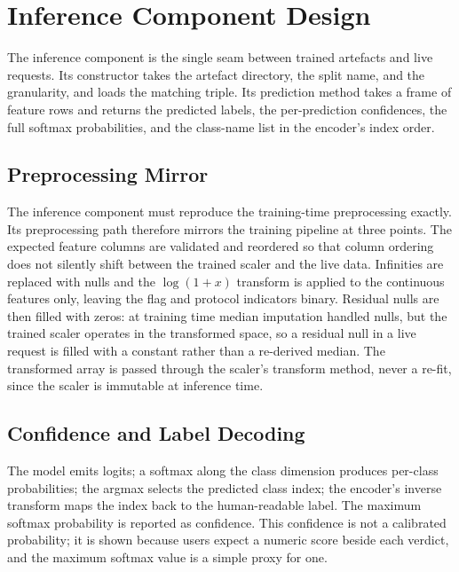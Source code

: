 \section{Inference Component Design}
\label{sec:inference_layer}

\par The inference component is the single seam between trained artefacts and live requests. Its constructor takes the artefact directory, the split name, and the granularity, and loads the matching triple. Its prediction method takes a frame of feature rows and returns the predicted labels, the per-prediction confidences, the full softmax probabilities, and the class-name list in the encoder's index order.

\subsection{Preprocessing Mirror}
\label{subsec:preprocessing_mirror}

\par The inference component must reproduce the training-time preprocessing exactly. Its preprocessing path therefore mirrors the training pipeline at three points. The expected feature columns are validated and reordered so that column ordering does not silently shift between the trained scaler and the live data. Infinities are replaced with nulls and the $\log(1+x)$ transform is applied to the continuous features only, leaving the flag and protocol indicators binary. Residual nulls are then filled with zeros: at training time median imputation handled nulls, but the trained scaler operates in the transformed space, so a residual null in a live request is filled with a constant rather than a re-derived median. The transformed array is passed through the scaler's transform method, never a re-fit, since the scaler is immutable at inference time.

\subsection{Confidence and Label Decoding}
\label{subsec:confidence_decoding}

\par The model emits logits; a softmax along the class dimension produces per-class probabilities; the argmax selects the predicted class index; the encoder's inverse transform maps the index back to the human-readable label. The maximum softmax probability is reported as confidence. This confidence is not a calibrated probability; it is shown because users expect a numeric score beside each verdict, and the maximum softmax value is a simple proxy for one.

